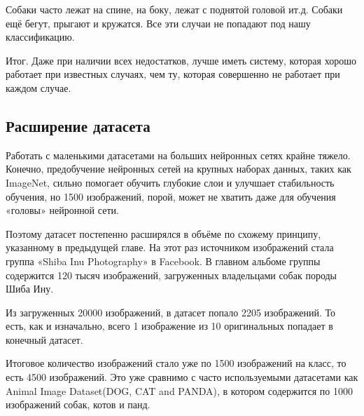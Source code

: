 Собаки часто лежат на спине, на боку, лежат с поднятой головой ит.д. Собаки ещё бегут, прыгают и кружатся. Все эти случаи не попадают под нашу классификацию.


Итог. Даже при наличии всех недостатков, лучше иметь систему, которая хорошо работает при известных случаях, чем ту, которая совершенно не работает при каждом случае. \cite{karpathy}


\subsection{Расширение датасета}\label{sect3_3_2}
Работать с маленькими датасетами на больших нейронных сетях крайне тяжело. Конечно, предобучение нейронных сетей на крупных наборах данных, таких как ImageNet, сильно помогает обучить глубокие слои и улучшает стабильность обучения, но 1500 изображений, порой, может не хватить даже для обучения «головы» нейронной сети.

Поэтому датасет постепенно расширялся в объёме по схожему принципу, указанному в предыдущей главе. На этот раз источником изображений стала группа «Shiba Inu Photography» в Facebook. В главном альбоме группы содержится 120 тысяч изображений, загруженных владельцами собак породы Шиба Ину.

Из загруженных 20000 изображений, в датасет попало 2205 изображений. То есть, как и изначально, всего 1 изображение из 10 оригинальных попадает в конечный датасет.

Итоговое количество изображений стало уже по 1500 изображений на класс, то есть 4500 изображений. Это уже сравнимо с часто используемыми датасетами как Animal Image Dataset(DOG, CAT and PANDA), в котором содержится по 1000 изображений собак, котов и панд. 


%        
%        
